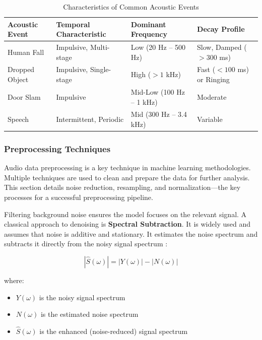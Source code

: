 \documentclass[11pt, a4paper, twoside]{article}
\begin{document}
\begin{table}[htbp]
\centering
\small %
\caption{Characteristics of Common Acoustic Events}
\label{tab:acoustic_events}
\renewcommand{\arraystretch}{1.5} %
\begin{tabularx}{\textwidth}{|l|X|X|X|}
\hline
\textbf{Acoustic Event} & \textbf{Temporal Characteristic} & \textbf{Dominant Frequency} & \textbf{Decay Profile} \\ 
\hline
Human Fall 
& Impulsive, Multi-stage 
& Low (20 Hz -- 500 Hz) 
& Slow, Damped ($>300$ ms) \\ 
\hline
Dropped Object 
& Impulsive, Single-stage 
& High ($>1$ kHz) 
& Fast ($<100$ ms) or Ringing \\ 
\hline
Door Slam 
& Impulsive 
& Mid-Low (100 Hz -- 1 kHz) 
& Moderate \\ 
\hline
Speech 
& Intermittent, Periodic 
& Mid (300 Hz -- 3.4 kHz) 
& Variable \\ 
\hline
\end{tabularx}
\end{table}

\subsubsection{Preprocessing Techniques}
Audio data preprocessing is a key technique in machine learning methodologies. Multiple techniques are used to clean and prepare the data for further analysis. This section details noise reduction, resampling, and normalization—the key processes for a successful preprocessing pipeline.

Filtering background noise ensures the model focuses on the relevant signal. A classical approach to denoising is \textbf{Spectral Subtraction}. It is widely used and assumes that noise is additive and stationary. It estimates the noise spectrum and subtracts it directly from the noisy signal spectrum \cite{pranami2016audio}:

\begin{equation}
\left| \hat{S}(\omega) \right| = \left| Y(\omega) \right| - \left| N(\omega) \right|
\end{equation}

where:
\begin{itemize}
\item $Y(\omega)$ is the noisy signal spectrum
\item $N(\omega)$ is the estimated noise spectrum
\item $\hat{S}(\omega)$ is the enhanced (noise-reduced) signal spectrum
\end{itemize}
\end{document}
